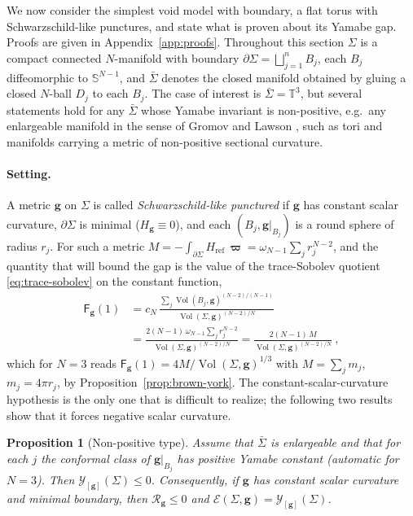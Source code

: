\documentclass[aps,prd,reprint,amsmath,amssymb,nofootinbib,longbibliography]{revtex4-2}
\DeclareMathOperator{\Vol}{Vol}
\newcommand{\Sph}{\mathbb{S}}
\newcommand{\Torus}{\mathbb{T}}
\newcommand{\g}{\mathbf{g}}                 %
\newcommand{\Rs}{\mathcal{R}}               %
\newcommand{\bvol}{\boldsymbol{\varpi}}     %
\newcommand{\Sigbar}{\bar{\Sigma}}          %
\newcommand{\Href}{H_{\mathrm{ref}}}
\newcommand{\EH}{\mathcal{E}}               %
\newcommand{\Y}{\mathcal{Y}}                %
\newcommand{\cN}{c_N}
\newcommand{\Fq}{\mathsf{F}}                %
\theoremstyle{plain}
\newtheorem{proposition}[theorem]{Proposition}
\theoremstyle{definition}
\theoremstyle{remark}
\begin{document}
We now consider the simplest void model with boundary, a flat torus with Schwarzschild-like punctures, and state what is proven about its Yamabe gap. Proofs are given in Appendix~\ref{app:proofs}. Throughout this section $\Sigma$ is a compact connected $N$-manifold with boundary $\partial\Sigma=\bigsqcup_{j=1}^nB_j$, each $B_j$ diffeomorphic to $\Sph^{N-1}$, and $\Sigbar$ denotes the closed manifold obtained by gluing a closed $N$-ball $D_j$ to each $B_j$. The case of interest is $\Sigbar=\Torus^3$, but several statements hold for any $\Sigbar$ whose Yamabe invariant is non-positive, e.g.\ any enlargeable manifold in the sense of Gromov and Lawson \cite{MR569070}, such as tori and manifolds carrying a metric of non-positive sectional curvature.

\paragraph*{Setting.} A metric $\g$ on $\Sigma$ is called \emph{Schwarzschild-like punctured} if $\g$ has constant scalar curvature, $\partial\Sigma$ is minimal ($H_\g\equiv0$), and each $(B_j,\g|_{B_j})$ is a round sphere of radius $r_j$. For such a metric $M=-\int_{\partial\Sigma}\Href\,\bvol=\omega_{N-1}\sum_jr_j^{N-2}$, and the quantity that will bound the gap is the value of the trace-Sobolev quotient \eqref{eq:trace-sobolev} on the constant function,
\begin{align}
\label{eq:F1-torus}
\Fq_\g(1)&=\cN\,\frac{\sum_{j}\Vol(B_j,\g)^{(N-2)/(N-1)}}{\Vol(\Sigma,\g)^{(N-2)/N}}\nonumber\\
&=\frac{2(N-1)\,\omega_{N-1}\sum_j r_j^{N-2}}{\Vol(\Sigma,\g)^{(N-2)/N}}
 =\frac{2(N-1)\,M}{\Vol(\Sigma,\g)^{(N-2)/N}}\ ,
\end{align}
which for $N=3$ reads $\Fq_\g(1)=4M/\Vol(\Sigma,\g)^{1/3}$ with $M=\sum_jm_j$, $m_j=4\pi r_j$, by Proposition~\ref{prop:brown-york}. The constant-scalar-curvature hypothesis is the only one that is difficult to realize; the following two results show that it forces negative scalar curvature.

\begin{proposition}[Non-positive type]
\label{prop:nonpositive}
Assume that $\Sigbar$ is enlargeable and that for each $j$ the conformal class of $\g|_{B_j}$ has positive Yamabe constant (automatic for $N=3$). Then $\Y_{[\g]}(\Sigma)\le0$. Consequently, if $\g$ has constant scalar curvature and minimal boundary, then $\Rs_\g\le0$ and $\EH(\Sigma,\g)=\Y_{[\g]}(\Sigma)$.
\end{proposition}
\end{document}
